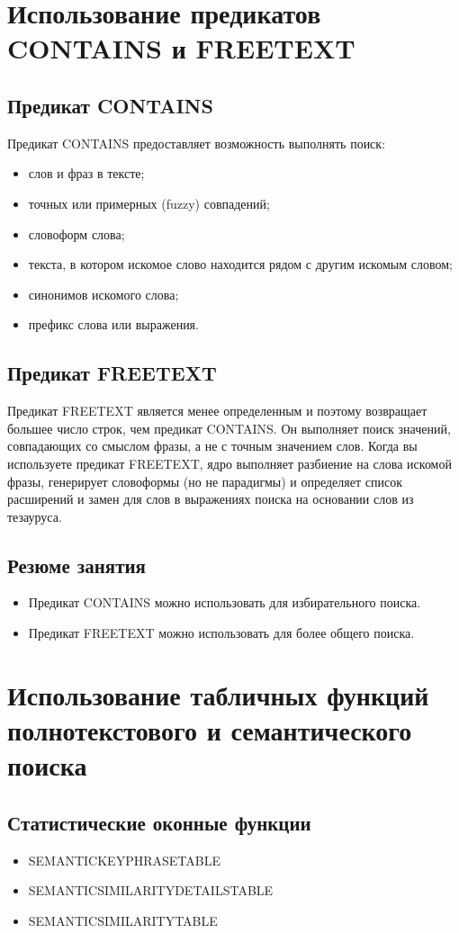 \section{Использование предикатов CONTAINS и FREETEXT}

\subsection{Предикат CONTAINS}

Предикат CONTAINS предоставляет возможность выполнять поиск: 

\begin{itemize}
	\item слов и фраз в тексте;
	\item точных или примерных (fuzzy) совпадений; 
	\item словоформ слова; 
	\item текста, в котором искомое слово находится рядом с другим искомым словом; 
	\item синонимов искомого слова; 
	\item префикс слова или выражения. 
\end{itemize}


\subsection{Предикат FREETEXT}
Предикат FREETEXT является менее определенным и поэтому возвращает большее
число строк, чем предикат CONTAINS. Он выполняет поиск значений, совпадающих
со смыслом фразы, а не с точным значением слов. Когда вы используете предикат
FREETEXT, ядро выполняет разбиение на слова искомой фразы, генерирует словоформы (но не парадигмы) и определяет список расширений и замен для слов в выражениях поиска на основании слов из тезауруса. 


\subsection*{Резюме занятия}
\begin{itemize}
	\item Предикат CONTAINS можно использовать для избирательного поиска. 
	\item Предикат FREETEXT можно использовать для более общего поиска. 
\end{itemize}




\section{Использование табличных функций полнотекстового и семантического поиска}

\subsection{Статистические оконные функции}
\begin{itemize}
	\item SEMANTICKEYPHRASETABLE
	\item SEMANTICSIMILARITYDETAILSTABLE
	\item SEMANTICSIMILARITYTABLE
\end{itemize}

